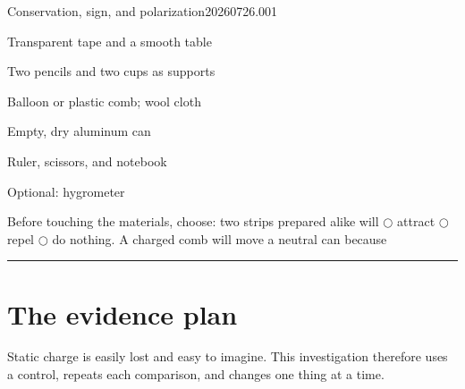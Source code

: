 

  {Conservation, sign, and polarization}{20260726.001}

\newcommand{\tapepair}[3]{%
  \begin{scope}[shift={(#1)}]
    \draw[very thick] (-.64,.68)--(-.50,-.60);
    \draw[black!48] (-.58,.67)--(-.44,-.58);
    \draw[very thick] (.64,.68)--(.50,-.60);
    \draw[black!48] (.58,.67)--(.44,-.58);
    \foreach \y in {.30,-.08,-.45}{
      \node[font=\scriptsize] at (-.34,\y) {#2};
      \node[font=\scriptsize] at (.34,\y) {#3};
    }
  \end{scope}}


\rolecard

\begin{materials}
  \item Transparent tape and a smooth table
  \item Two pencils and two cups as supports
  \item Balloon or plastic comb; wool cloth
  \item Empty, dry aluminum can
  \item Ruler, scissors, and notebook
  \item Optional: hygrometer
\end{materials}

\begin{predict}
Before touching the materials, choose: two strips prepared alike will
\(\bigcirc\) attract \(\bigcirc\) repel \(\bigcirc\) do nothing. A charged comb
will move a neutral can because \rule{.48\linewidth}{.3pt}
\end{predict}

\small
\section{The evidence plan}

Static charge is easily lost and easy to imagine. This investigation therefore
uses a control, repeats each comparison, and changes one thing at a time.

\begin{center}
\end{center}

